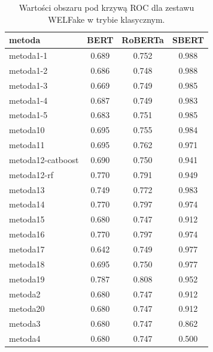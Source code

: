 \begin{table}[H]
	\centering
	\caption{Wartości obszaru pod krzywą ROC dla zestawu WELFake w trybie klasycznym.}
	\label{tab:roc_auc_welfake_classic}
	\small
	\begin{tabular}{lccc}
		\toprule
		\textbf{metoda}   & \textbf{BERT} & \textbf{RoBERTa} & \textbf{SBERT} \\
		\midrule
		metoda1-1         & 0.689         & 0.752            & 0.988          \\
		metoda1-2         & 0.686         & 0.748            & 0.988          \\
		metoda1-3         & 0.669         & 0.749            & 0.985          \\
		metoda1-4         & 0.687         & 0.749            & 0.983          \\
		metoda1-5         & 0.683         & 0.751            & 0.985          \\
		metoda10          & 0.695         & 0.755            & 0.984          \\
		metoda11          & 0.695         & 0.762            & 0.971          \\
		metoda12-catboost & 0.690         & 0.750            & 0.941          \\
		metoda12-rf       & 0.770         & 0.791            & 0.949          \\
		metoda13          & 0.749         & 0.772            & 0.983          \\
		metoda14          & 0.770         & 0.797            & 0.974          \\
		metoda15          & 0.680         & 0.747            & 0.912          \\
		metoda16          & 0.770         & 0.797            & 0.974          \\
		metoda17          & 0.642         & 0.749            & 0.977          \\
		metoda18          & 0.695         & 0.750            & 0.977          \\
		metoda19          & 0.787         & 0.808            & 0.952          \\
		metoda2           & 0.680         & 0.747            & 0.912          \\
		metoda20          & 0.680         & 0.747            & 0.912          \\
		metoda3           & 0.680         & 0.747            & 0.862          \\
		metoda4           & 0.680         & 0.747            & 0.500          \\

\end{tabular}
\end{table}
